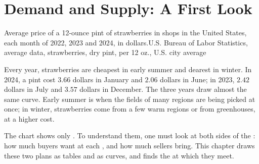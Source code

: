 \chapter{Demand and Supply: A First Look}\label{ch:g7:demand-and-supply-first-look}

\begin{openingchart}{Average price of a 12-ounce pint of strawberries in shops in the
United States, each month of 2022, 2023 and 2024, in dollars.}{U.S. Bureau of Labor
Statistics, average  data, strawberries, dry pint, per 12 oz., U.S. city average}
\end{openingchart}

Every year, strawberries are cheapest in early summer and dearest in winter. In 2024, a
pint cost $3.66$ dollars in January and $2.06$ dollars in June; in 2023, $2.42$ dollars in
July and $3.57$ dollars in December. The three years draw almost the same curve. Early
summer is when the fields of many regions are being picked at once; in winter, strawberries
come from a few warm regions or from greenhouses, at a higher cost.

The chart shows only . To understand them, one must look at both sides of the
: how much buyers want at each , and how much sellers bring. This chapter
draws these two plans as tables and as curves, and finds the  at which they meet.

